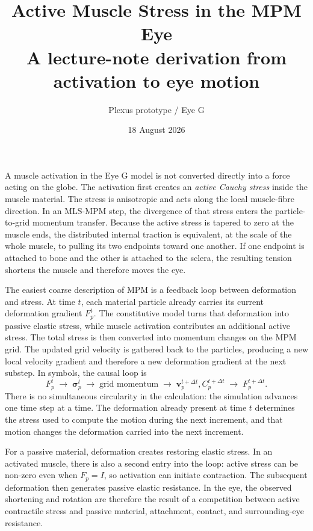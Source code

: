 \documentclass[11pt]{article}
\title{\textbf{Active Muscle Stress in the MPM Eye}\\
\large A lecture-note derivation from activation to eye motion}
\author{Plexus prototype / Eye G}
\date{18 August 2026}
\newcommand{\sig}{\boldsymbol{\sigma}}
\begin{document}
\maketitle

\begin{tcolorbox}[colback=soft,colframe=accent,title=What this note derives]
A muscle activation in the Eye G model is not converted directly into a force acting on the globe. The activation first creates an \emph{active Cauchy stress} inside the muscle material. The stress is anisotropic and acts along the local muscle-fibre direction. In an MLS-MPM step, the divergence of that stress enters the particle-to-grid momentum transfer. Because the active stress is tapered to zero at the muscle ends, the distributed internal traction is equivalent, at the scale of the whole muscle, to pulling its two endpoints toward one another. If one endpoint is attached to bone and the other is attached to the sclera, the resulting tension shortens the muscle and therefore moves the eye.
\end{tcolorbox}

\begin{tcolorbox}[colback=white,colframe=accent,title=The MPM feedback loop in one picture]
The easiest coarse description of MPM is a feedback loop between deformation and stress. At time $t$, each material particle already carries its current deformation gradient $F_p^t$. The constitutive model turns that deformation into passive elastic stress, while muscle activation contributes an additional active stress. The total stress is then converted into momentum changes on the MPM grid. The updated grid velocity is gathered back to the particles, producing a new local velocity gradient and therefore a new deformation gradient at the next substep. In symbols, the causal loop is
\begin{equation}
F_p^t \;\longrightarrow\; \sig_p^t \;\longrightarrow\; \text{grid momentum} \;\longrightarrow\; \mathbf v_p^{t+\Delta t},C_p^{t+\Delta t} \;\longrightarrow\; F_p^{t+\Delta t}.
\label{eq:mpm-loop}
\end{equation}
There is no simultaneous circularity in the calculation: the simulation advances one time step at a time. The deformation already present at time $t$ determines the stress used to compute the motion during the next increment, and that motion changes the deformation carried into the next increment.

For a passive material, deformation creates restoring elastic stress. In an activated muscle, there is also a second entry into the loop: active stress can be non-zero even when $F_p=I$, so activation can initiate contraction. The subsequent deformation then generates passive elastic resistance. In the eye, the observed shortening and rotation are therefore the result of a competition between active contractile stress and passive material, attachment, contact, and surrounding-eye resistance.
\end{tcolorbox}
\end{document}
